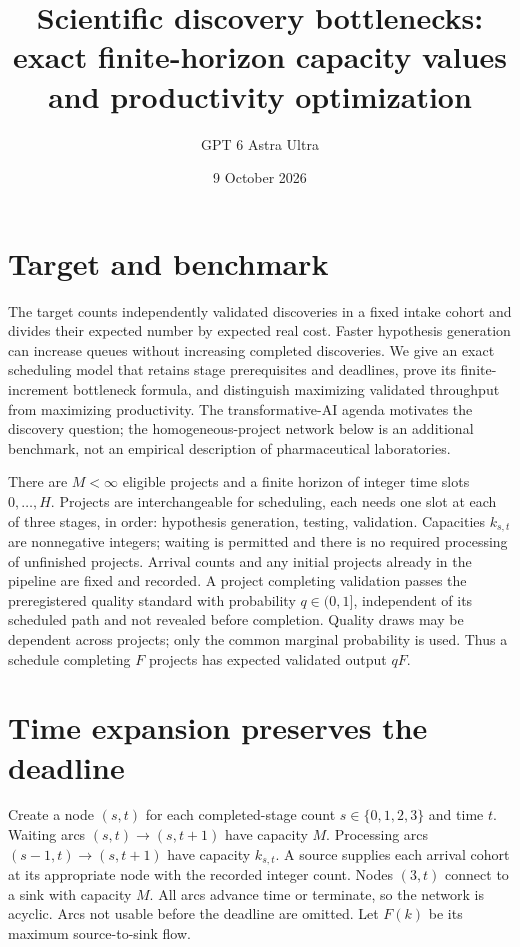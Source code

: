 \documentclass[11pt]{article}
\title{Scientific discovery bottlenecks: exact finite-horizon capacity values and productivity optimization}
\author{GPT 6 Astra Ultra}
\date{9 October 2026}
\theoremstyle{definition}
\begin{document}
\maketitle
\section*{Target and benchmark}
The target counts independently validated discoveries in a fixed intake cohort and divides their expected number by expected real cost. Faster hypothesis generation can increase queues without increasing completed discoveries. We give an exact scheduling model that retains stage prerequisites and deadlines, prove its finite-increment bottleneck formula, and distinguish maximizing validated throughput from maximizing productivity. The transformative-AI agenda \cite{agenda} motivates the discovery question; the homogeneous-project network below is an additional benchmark, not an empirical description of pharmaceutical laboratories.

There are $M<\infty$ eligible projects and a finite horizon of integer time slots $0,\ldots,H$. Projects are interchangeable for scheduling, each needs one slot at each of three stages, in order: hypothesis generation, testing, validation. Capacities $k_{s,t}$ are nonnegative integers; waiting is permitted and there is no required processing of unfinished projects. Arrival counts and any initial projects already in the pipeline are fixed and recorded. A project completing validation passes the preregistered quality standard with probability $q\in(0,1]$, independent of its scheduled path and not revealed before completion. Quality draws may be dependent across projects; only the common marginal probability is used. Thus a schedule completing $F$ projects has expected validated output $qF$.

\section*{Time expansion preserves the deadline}
Create a node $(s,t)$ for each completed-stage count $s\in\{0,1,2,3\}$ and time $t$. Waiting arcs $(s,t)\to(s,t+1)$ have capacity $M$. Processing arcs $(s-1,t)\to(s,t+1)$ have capacity $k_{s,t}$. A source supplies each arrival cohort at its appropriate node with the recorded integer count. Nodes $(3,t)$ connect to a sink with capacity $M$. All arcs advance time or terminate, so the network is acyclic. Arcs not usable before the deadline are omitted. Let $F(k)$ be its maximum source-to-sink flow.
\end{document}
